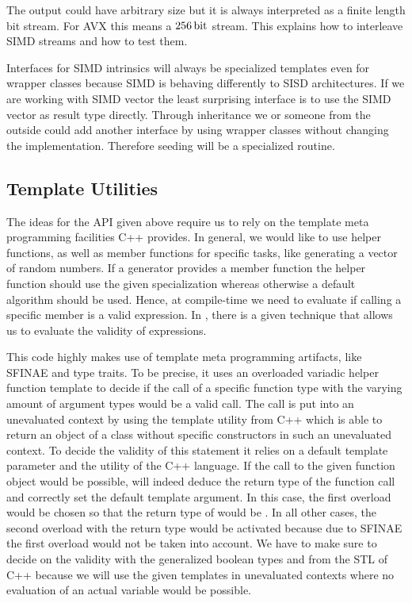 \documentclass{stdlocal}
\begin{document}
    The output could have arbitrary size but it is always interpreted as a finite length bit stream.
    For AVX this means a $256\, \mathrm{bit}$ stream.
    This explains how to interleave SIMD streams and how to test them.

    Interfaces for SIMD intrinsics will always be specialized templates even for wrapper classes because SIMD is behaving differently to SISD architectures.
    If we are working with SIMD vector the least surprising interface is to use the SIMD vector as result type directly.
    Through inheritance we or someone from the outside could add another interface by using wrapper classes without changing the implementation.
    Therefore seeding will be a specialized routine.

  \subsection{Template Utilities} %
  \label{sub:utilities}
    The ideas for the API given above require us to rely on the template meta programming facilities C++ provides.
    In general, we would like to use helper functions, as well as member functions for specific tasks, like generating a vector of random numbers.
    If a generator provides a member function the helper function should use the given specialization whereas otherwise a default algorithm should be used.
    Hence, at compile-time we need to evaluate if calling a specific member is a valid expression.
    In \textcite{vandevoorde2018}, there is a given technique that allows us to evaluate the validity of expressions.

    This code highly makes use of template meta programming artifacts, like SFINAE and type traits.
    To be precise, it uses an overloaded variadic helper function template  to decide if the call of a specific function type  with the varying amount of argument types  would be a valid call.
    The call is put into an unevaluated context by using the  template utility from C++ which is able to return an object of a class without specific constructors in such an unevaluated context.
    To decide the validity of this statement it relies on a default template parameter and the  utility of the C++ language.
    If the call to the given function object would be possible,  will indeed deduce the return type of the function call and correctly set the default template argument.
    In this case, the first overload would be chosen so that the return type of  would be .
    In all other cases, the second overload with the return type  would be activated because due to SFINAE the first overload would not be taken into account.
    We have to make sure to decide on the validity with the generalized boolean types  and  from the STL of C++ because we will use the given templates in unevaluated contexts where no evaluation of an actual  variable would be possible.
\end{document}
